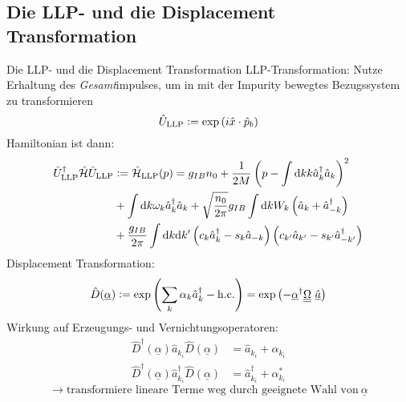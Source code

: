 \documentclass{beamer}
\newcommand{\defeq}{\vcentcolon=}
\newcommand{\CR}{\hat a^\dagger}
\newcommand{\AN}{\hat a}
\newcommand{\ham}{\hat{\mathcal{H}}}
\begin{document}
\subsection{Die LLP- und die Displacement Transformation}
\begin{frame}[allowframebreaks]{Die LLP- und die Displacement Transformation}
LLP-Transformation: Nutze Erhaltung des \emph{Gesamt}impulses, um in mit der Impurity bewegtes Bezugssystem zu transformieren
$$
\hat U_{\mathrm{LLP}}\defeq \exp\left(i\hat x\cdot \hat p_b\right)
$$
Hamiltonian ist dann:
\begin{align*}
\hat U_{\mathrm{LLP}}^\dagger\ham\hat U_{\mathrm{LLP}} &\defeq \ham_{\mathrm{LLP}}(p) =g_{IB}n_0+\frac{1}{2M}\left(p-\int\mathrm d k k \CR_k\AN_k \right)^2\\ &+\int\mathrm d k\omega_{ k}\CR_{ k}\AN_{ k}+\sqrt{\frac{n_0}{2\pi}}g_{IB}\int \mathrm d k W_k \left(\AN_{ k}+\CR_{- k}\right) \\ &+ \frac{g_{IB}}{2\pi}\int\mathrm d k\mathrm d k^\prime \left(c_k\CR_k-s_k\AN_{-k}\right)\left(c_{k^\prime}\AN_{k^\prime}-s_{k^\prime}\CR_{-k^\prime}\right)
\end{align*}
\vfill
\framebreak
Displacement Transformation:
$$
\hat D(\underline\alpha)\defeq\exp\left(\sum_k\alpha_k\CR_k-\mathrm{h.c.}\right)=\exp\left(-\underline\alpha^\dagger{\underline{\underline\Omega}}\ \underline{\hat a}\right)
$$
Wirkung auf Erzeugungs- und Vernichtungsoperatoren:
\begin{align*}
\hat D^\dagger(\underline \alpha)\AN_{k_i}\hat D(\underline\alpha)&=\AN_{k_i}+\alpha_{k_i}\\
\hat D^\dagger(\underline \alpha)\CR_{k_i}\hat D(\underline\alpha)&=\CR_{k_i}+\alpha_{k_i}^*
\end{align*}
$$
\rightarrow \text{transformiere lineare Terme weg durch geeignete Wahl von}\ \underline\alpha
$$
\end{frame}
\end{document}

